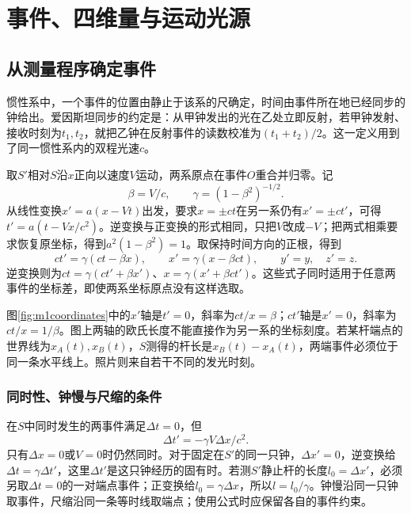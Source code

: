 \chapter{事件、四维量与运动光源}
\section{从测量程序确定事件}\label{th:m1events}
惯性系中，一个事件的位置由静止于该系的尺确定，时间由事件所在地已经同步的钟给出。爱因斯坦同步的约定是：从甲钟发出的光在乙处立即反射，若甲钟发射、接收时刻为$t_1,t_2$，就把乙钟在反射事件的读数校准为$(t_1+t_2)/2$。这一定义用到了同一惯性系内的双程光速$c$。

取$S'$相对$S$沿$x$正向以速度$V$运动，两系原点在事件$O$重合并归零。记
\[
 \beta=V/c,\qquad \gamma=(1-\beta^2)^{-1/2}.
\]
从线性变换$x'=a(x-Vt)$出发，要求$x=\pm ct$在另一系仍有$x'=\pm ct'$，可得$t'=a(t-Vx/c^2)$。逆变换与正变换的形式相同，只把$V$改成$-V$；把两式相乘要求恢复原坐标，得到$a^2(1-\beta^2)=1$。取保持时间方向的正根，得到
\begin{equation}\label{eq:m1lorentz}
 ct'=\gamma(ct-\beta x),\qquad x'=\gamma(x-\beta ct),\qquad y'=y,\quad z'=z.
\end{equation}
逆变换则为$ct=\gamma(ct'+\beta x')$、$x=\gamma(x'+\beta ct')$。这些式子同时适用于任意两事件的坐标差，即使两系坐标原点没有这样选取。

图\ref{fig:m1coordinates}中的$x'$轴是$t'=0$，斜率为$ct/x=\beta$；$ct'$轴是$x'=0$，斜率为$ct/x=1/\beta$。图上两轴的欧氏长度不能直接作为另一系的坐标刻度。若某杆端点的世界线为$x_A(t),x_B(t)$，$S$测得的杆长是$x_B(t)-x_A(t)$，两端事件必须位于同一条水平线上。照片则来自若干不同的发光时刻。

\subsection{同时性、钟慢与尺缩的条件}
在$S$中同时发生的两事件满足$\Delta t=0$，但
\[
 \Delta t'=-\gamma V\Delta x/c^2.
\]
只有$\Delta x=0$或$V=0$时仍然同时。对于固定在$S'$的同一只钟，$\Delta x'=0$，逆变换给$\Delta t=\gamma\Delta t'$，这里$\Delta t'$是这只钟经历的固有时。若测$S'$静止杆的长度$l_0=\Delta x'$，必须另取$\Delta t=0$的一对端点事件；正变换给$l_0=\gamma\Delta x$，所以$l=l_0/\gamma$。钟慢沿同一只钟取事件，尺缩沿同一条等时线取端点；使用公式时应保留各自的事件约束。

